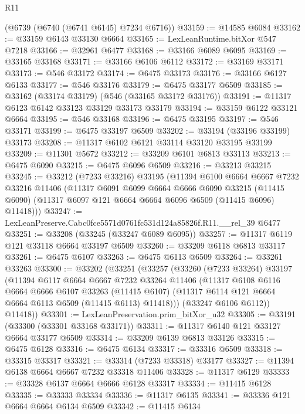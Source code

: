\begin{lexlean}{R11}
\begin{coremodule}
    (@6739 (@6740 (@6741 @6145) @7234 @6716))
@33159 := @14585 @6084
@33162 := @33159 @6143 @33130 @6664
@33165 := LexLeanRuntime.bitXor @547 @7218
@33166 := @32961 @6477
@33168 := @33166 @6089 @6095
@33169 := @33165 @33168
@33171 := @33166 @6106 @6112
@33172 := @33169 @33171
@33173 := @546 @33172
@33174 := @6475 @33173
@33176 := @33166 @6127 @6133
@33177 := @546 @33176
@33179 := @6475 @33177 @6509
@33185 := @33162 (@33174 @33179) (@546 (@33165 @33172 @33176))
@33191 := @11317 @6123 @6142 @33123 @33129 @33173 @33179
@33194 := @33159 @6122 @33121 @6664
@33195 := @546 @33168
@33196 := @6475 @33195
@33197 := @546 @33171
@33199 := @6475 @33197 @6509
@33202 := @33194 (@33196 @33199) @33173
@33208 := @11317 @6102 @6121 @33114 @33120 @33195 @33199
@33209 := @11301 @5672
@33212 := @33209 @6101 @6813 @33113
@33213 := @6475 @6090
@33215 := @6475 @6096 @6509
@33216 := @33213 @33215
@33245 := @33212
    (@7233 @33216)
    @33195
    (@11394
      @6100
      @6664
      @6667
      @7232
      @33216
      @11406
      (@11317
        @6091
        @6099
        @6664
        @6666
        @6090
        @33215
        (@11415 @6090)
        (@11317 @6097 @121 @6664 @6664 @6096 @6509 (@11415 @6096) @11418)))
@33247 := LexLeanPreserve.Cabc0fce5571d0761fc531d124a85826f.R11.__rel_39 @6477
@33251 := @33208 (@33245 (@33247 @6089 @6095))
@33257 := @11317 @6119 @121 @33118 @6664 @33197 @6509
@33260 := @33209 @6118 @6813 @33117
@33261 := @6475 @6107
@33263 := @6475 @6113 @6509
@33264 := @33261 @33263
@33300 := @33202
    (@33251
      (@33257
        (@33260
          (@7233 @33264)
          @33197
          (@11394
            @6117
            @6664
            @6667
            @7232
            @33264
            @11406
            (@11317
              @6108
              @6116
              @6664
              @6666
              @6107
              @33263
              (@11415 @6107)
              (@11317 @6114 @121 @6664 @6664 @6113 @6509 (@11415 @6113) @11418)))
          (@33247 @6106 @6112))
        @11418))
@33301 := LexLeanPreservation.prim_bitXor_u32
@33305 := @33191 (@33300 (@33301 @33168 @33171))
@33311 := @11317 @6140 @121 @33127 @6664 @33177 @6509
@33314 := @33209 @6139 @6813 @33126
@33315 := @6475 @6128
@33316 := @6475 @6134
@33317 := @33316 @6509
@33318 := @33315 @33317
@33321 := @33314 (@7233 @33318) @33177
@33327 := @11394 @6138 @6664 @6667 @7232 @33318 @11406
@33328 := @11317 @6129
@33333 := @33328 @6137 @6664 @6666 @6128 @33317
@33334 := @11415 @6128
@33335 := @33333 @33334
@33336 := @11317 @6135
@33341 := @33336 @121 @6664 @6664 @6134 @6509
@33342 := @11415 @6134

\end{coremodule}
\end{lexlean}
